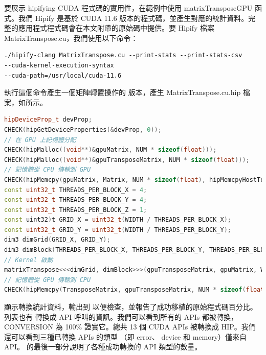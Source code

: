 要展示 hipifying CUDA 程式碼的實用性，在範例中使用 matrixTransposeGPU 函式。我們 Hipify 是基於 CUDA 11.6 版本的程式碼，並產生對應的統計資料。完整的應用程式程式碼會在本文附帶的原始碼中提供。要 Hipify 檔案 MatrixTranspose.cu，我們使用以下命令：

\begin{lstlisting}
./hipify-clang MatrixTranspose.cu --print-stats --print-stats-csv
--cuda-kernel-execution-syntax
--cuda-path=/usr/local/cuda-11.6
\end{lstlisting}

執行這個命令產生一個矩陣轉置操作的  版本，產生 MatrixTranspose.cu.hip 檔案，如所示。

\begin{lstlisting}[language=C++, caption={Hipified 矩陣轉置的範例片段}, label={lst:Hipified matrix-transpose example snippet}]
hipDeviceProp_t devProp;
CHECK(hipGetDeviceProperties(&devProp, 0));
// 在 GPU 上記憶體分配
CHECK(hipMalloc((void**)&gpuMatrix, NUM * sizeof(float)));
CHECK(hipMalloc((void**)&gpuTransposeMatrix, NUM * sizeof(float)));
// 記憶體從 CPU 傳輸到 GPU
CHECK(hipMemcpy(gpuMatrix, Matrix, NUM * sizeof(float), hipMemcpyHostToDevice));
const uint32_t THREADS_PER_BLOCK_X = 4;
const uint32_t THREADS_PER_BLOCK_Y = 4;
const uint32_t THREADS_PER_BLOCK_Z = 1;
const uint32)t GRID_X = uint32_t(WIDTH / THREADS_PER_BLOCK_X);
const uint32_t GRID_Y = uint32_t(WIDTH / THREADS_PER_BLOCK_Y);
dim3 dimGrid(GRID_X, GRID_Y);
dim3 dimBlock(THREADS_PER_BLOCK_X, THREADS_PER_BLOCK_Y, THREADS_PER_BLOCK_Z);
// Kernel 啟動
matrixTranspose<<<dimGrid, dimBlock>>>(gpuTransposeMatrix, gpuMatrix, WIDTH);
// 記憶體從 GPU 傳輸到 CPU
CHECK(hipMemcpy(TransposeMatrix, gpuTransposeMatrix, NUM * sizeof(float), hipMemcpyDeviceToHost));
\end{lstlisting}

 顯示轉換統計資料，輸出到  以便檢查，並報告了成功移植的原始程式碼百分比。列表也有  轉換成  API 呼叫的資訊。我們可以看到所有的 APIs 都被轉換，CONVERSION 為 100\% 證實它。總共 13 個 CUDA APIs 被轉換成 HIP。我們還可以看到三種已轉換 APIs 的類型 （即 error、 device 和 memory）僅來自 API。 的最後一部分說明了各種成功轉換的  API 類型的數量。

